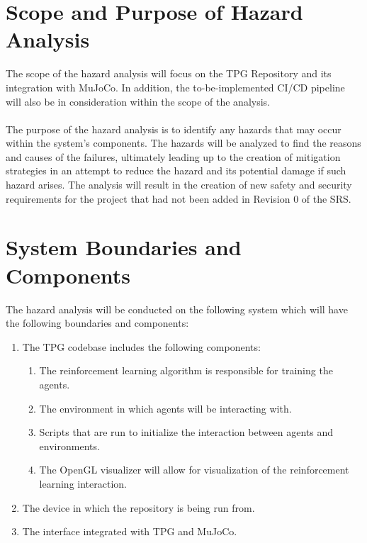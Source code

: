 \documentclass{article}
\begin{document}
\section{Scope and Purpose of Hazard Analysis}


The scope of the hazard analysis will focus on the TPG Repository and its integration with MuJoCo. In addition, the to-be-implemented CI/CD pipeline will also be in consideration within the scope of the analysis. 
\\\\
The purpose of the hazard analysis is to identify any hazards that may occur within the system’s components. The hazards will be analyzed to find the reasons and causes of the failures, ultimately leading up to the creation of mitigation strategies in an attempt to reduce the hazard and its potential damage if such hazard arises. The analysis will result in the creation of new safety and security requirements for the project that had not been added in Revision 0 of the SRS.

\section{System Boundaries and Components}


The hazard analysis will be conducted on the following system which will have the following boundaries and components:
\begin{enumerate}
    \item The TPG codebase includes the following components:
    \begin{enumerate}[label=(\alph*)]
        \item The reinforcement learning algorithm is responsible for training the agents.
        \item The environment in which agents will be interacting with.
        \item Scripts that are run to initialize the interaction between agents and environments.
        \item The OpenGL visualizer will allow for visualization of the reinforcement learning interaction. 
    \end{enumerate}
    \item The device in which the repository is being run from.
    \item The interface integrated with TPG and MuJoCo.
\end{enumerate}
\end{document}
